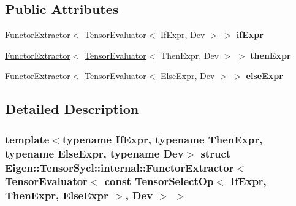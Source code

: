 \subsection*{Public Attributes}
\begin{DoxyCompactItemize}
\item 
\mbox{\label{struct_eigen_1_1_tensor_sycl_1_1internal_1_1_functor_extractor_3_01_tensor_evaluator_3_01const_08443a240f6166215dcd0107fd174ad7c_a9502c0e97836f270f205b79b6899e78e}} 
\hyperlink{struct_eigen_1_1_tensor_sycl_1_1internal_1_1_functor_extractor}{Functor\+Extractor}$<$ \hyperlink{struct_eigen_1_1_tensor_evaluator}{Tensor\+Evaluator}$<$ If\+Expr, Dev $>$ $>$ {\bfseries if\+Expr}
\item 
\mbox{\label{struct_eigen_1_1_tensor_sycl_1_1internal_1_1_functor_extractor_3_01_tensor_evaluator_3_01const_08443a240f6166215dcd0107fd174ad7c_ab3538af731eb9559ab7b7afdb598dc15}} 
\hyperlink{struct_eigen_1_1_tensor_sycl_1_1internal_1_1_functor_extractor}{Functor\+Extractor}$<$ \hyperlink{struct_eigen_1_1_tensor_evaluator}{Tensor\+Evaluator}$<$ Then\+Expr, Dev $>$ $>$ {\bfseries then\+Expr}
\item 
\mbox{\label{struct_eigen_1_1_tensor_sycl_1_1internal_1_1_functor_extractor_3_01_tensor_evaluator_3_01const_08443a240f6166215dcd0107fd174ad7c_aa631168395c3717d5bad615e1d3e5b85}} 
\hyperlink{struct_eigen_1_1_tensor_sycl_1_1internal_1_1_functor_extractor}{Functor\+Extractor}$<$ \hyperlink{struct_eigen_1_1_tensor_evaluator}{Tensor\+Evaluator}$<$ Else\+Expr, Dev $>$ $>$ {\bfseries else\+Expr}
\end{DoxyCompactItemize}


\subsection{Detailed Description}
\subsubsection*{template$<$typename If\+Expr, typename Then\+Expr, typename Else\+Expr, typename Dev$>$\newline
struct Eigen\+::\+Tensor\+Sycl\+::internal\+::\+Functor\+Extractor$<$ Tensor\+Evaluator$<$ const Tensor\+Select\+Op$<$ If\+Expr, Then\+Expr, Else\+Expr $>$, Dev $>$ $>$}

